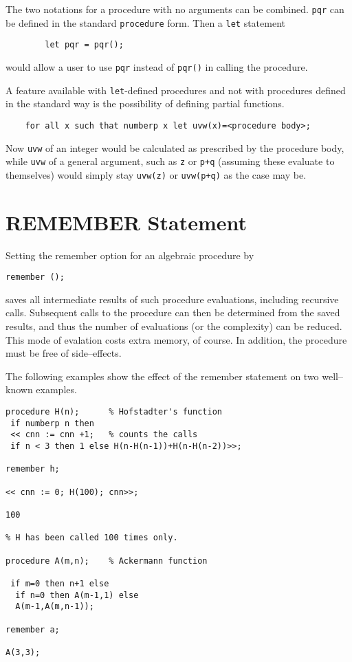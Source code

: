 The two notations for a procedure with no arguments can be combined. \texttt{pqr}
can be defined in the standard \texttt{procedure} form. Then a \texttt{let}
statement
\begin{verbatim}
        let pqr = pqr();
\end{verbatim}
would allow a user to use \texttt{pqr} instead of \texttt{pqr()} in calling the
procedure.

A feature available with \texttt{let}-defined procedures and not with procedures
defined in the standard way is the possibility of defining partial
functions.
\begin{verbatim}
    for all x such that numberp x let uvw(x)=<procedure body>;
\end{verbatim}
Now \texttt{uvw} of an integer would be calculated as prescribed by the procedure
body, while \texttt{uvw} of a general argument, such as \texttt{z} or \texttt{p+q}
(assuming these evaluate to themselves) would simply stay \texttt{uvw(z)}
or \texttt{uvw(p+q)} as the case may be.


\section{REMEMBER Statement}
\hypertarget{command:REMEMBER}{}

Setting the remember option for an algebraic procedure by
\begin{syntax}
     \texttt{remember (}\texttt{);}
\end{syntax}
saves all intermediate results of such procedure evaluations, including
recursive calls.  Subsequent calls to the procedure can then be determined
from the saved results, and thus the number of evaluations (or the
complexity) can be reduced.  This mode of evalation costs extra memory, of
course.  In addition, the procedure must be free of side--effects.

The following examples show the effect of the remember statement
on two well--known examples.

\begin{samepage}
\begin{verbatim}
procedure H(n);      % Hofstadter's function
 if numberp n then
 << cnn := cnn +1;   % counts the calls
 if n < 3 then 1 else H(n-H(n-1))+H(n-H(n-2))>>;

remember h;

<< cnn := 0; H(100); cnn>>;

100

% H has been called 100 times only.

procedure A(m,n);    % Ackermann function

 if m=0 then n+1 else
  if n=0 then A(m-1,1) else
  A(m-1,A(m,n-1));

remember a;

A(3,3);

\end{verbatim}
\end{samepage}
